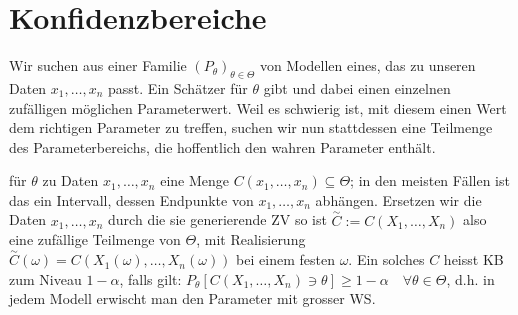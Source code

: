 
\section{Konfidenzbereiche}
Wir suchen aus einer Familie $(P_\theta)_{\theta \in \Theta}$ von Modellen eines, das zu unseren Daten $x_1, \dots, x_n$ passt. Ein Schätzer für $\theta$ gibt und dabei einen einzelnen zufälligen möglichen Parameterwert. Weil es schwierig ist, mit diesem einen Wert dem richtigen Parameter zu treffen, suchen wir nun stattdessen eine Teilmenge des Parameterbereichs, die hoffentlich den wahren Parameter enthält.
\begin{itemize}
     für $\theta$ zu Daten $x_1, \dots, x_n$ eine Menge $C(x_1, \dots, x_n) \subseteq \Theta$; in den meisten Fällen ist das ein Intervall, dessen Endpunkte von $x_1, \dots, x_n$ abhängen. Ersetzen wir die Daten $x_1, \dots, x_n$ durch die sie generierende ZV so ist $\overset{\sim}{C} := C(X_1, \dots, X_n)$ also eine zufällige Teilmenge von $\Theta$, mit Realisierung $\overset{\sim}{C}(\omega) = C(X_1(\omega), \dots, X_n(\omega))$ bei einem festen $\omega$. Ein solches $C$ heisst KB zum Niveau $1 - \alpha$, falls gilt: $P_\theta[C(X_1, \dots, X_n) \ni \theta] \ge 1 - \alpha \quad \forall \theta \in \Theta$, d.h. in jedem Modell erwischt man den Parameter mit grosser WS.
\end{itemize}

